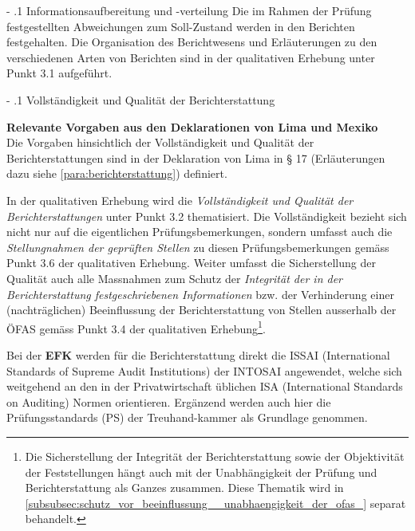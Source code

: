 \documentclass[10pt]{article}
\makeatletter
\renewcommand\paragraph{\@startsection{paragraph}{3}{0mm}{-\baselineskip}{.1\baselineskip}{\normalfont\normalsize\bfseries}}
\renewcommand\subparagraph{\@startsection{subparagraph}{4}{0mm}{-\baselineskip}{.1\baselineskip}{\normalfont\normalsize\bfseries}}
\renewcommand\paragraph{%
\@startsection{paragraph}{3}{0mm}%
{-\baselineskip}%
{.1\baselineskip}%
{\normalfont\normalsize\bfseries}}
\renewcommand\subparagraph{%
\@startsection{subparagraph}{4}{0mm}%
{-\baselineskip}%
{.1\baselineskip}%
{\normalfont\normalsize\bfseries}}
\makeatother
\begin{document}
\paragraph{Informationsaufbereitung und -verteilung}\label{para:informationsaufbereitung_und__verteilung}
Die im Rahmen der Prüfung festgestellten Abweichungen zum Soll-Zustand werden in den Berichten festgehalten. Die Organisation des Berichtwesens und Erläuterungen zu den verschiedenen Arten von Berichten sind in der qualitativen Erhebung unter Punkt 3.1 aufgeführt.

\subparagraph{Vollständigkeit und Qualität der Berichterstattung}\label{subpara:vollstaendigkeit_und_qualitaet_der_berichterstattung}
\begin{shaded}
\textbf{Relevante Vorgaben aus den Deklarationen von Lima und Mexiko}\\
Die Vorgaben hinsichtlich der Vollständigkeit und Qualität der Berichterstattungen sind in der Deklaration von Lima in § 17 (Erläuterungen dazu siehe \vref{para:berichterstattung}) definiert.

\end{shaded}
In der qualitativen Erhebung wird die \textit{Vollständigkeit und Qualität der Berichterstattungen} unter Punkt 3.2 thematisiert. Die Vollständigkeit bezieht sich nicht nur auf die eigentlichen Prüfungsbemerkungen, sondern umfasst auch die \textit{Stellungnahmen der geprüften Stellen} zu diesen Prüfungsbemerkungen gemäss Punkt 3.6 der qualitativen Erhebung. Weiter umfasst die Sicherstellung der Qualität auch alle Massnahmen zum Schutz der \textit{Integrität der in der Berichterstattung festgeschriebenen Informationen} bzw. der Verhinderung einer (nachträglichen) Beeinflussung der Berichterstattung von Stellen ausserhalb der ÖFAS gemäss Punkt 3.4 der qualitativen Erhebung\footnote{Die Sicherstellung der Integrität der Berichterstattung sowie der Objektivität der Feststellungen hängt auch mit der Unabhängigkeit der Prüfung und Berichterstattung als Ganzes zusammen. Diese Thematik wird in \vref{subsubsec:schutz_vor_beeinflussung__unabhaengigkeit_der_ofas_} separat behandelt.}.

Bei der \textbf{EFK} werden für die Berichterstattung direkt die ISSAI (International Standards of Supreme Audit Institutions) der INTOSAI angewendet, welche sich weitgehend an den in der Privatwirtschaft üblichen ISA (International Standards on Auditing) Normen orientieren. Ergänzend werden auch hier die Prüfungsstandards (PS) der Treuhand-kammer als Grundlage genommen.
\end{document}
